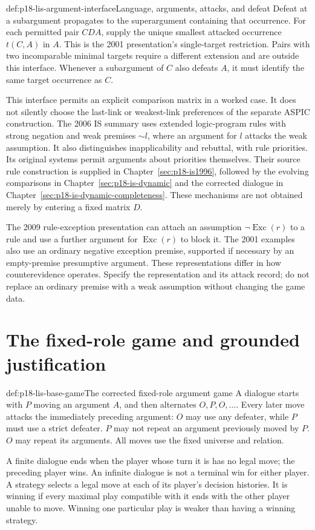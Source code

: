 \begin{hbdefinition}{def:p18-lis-argument-interface}{Language, arguments, attacks, and defeat}
Defeat at a subargument propagates to the superargument containing
that occurrence. For each permitted pair \(CDA\), supply the unique
smallest attacked occurrence \(t(C,A)\) in \(A\).
This is the 2001 presentation's single-target restriction.
Pairs with two incomparable minimal targets require a different
extension and are outside this interface.
Whenever a subargument of \(C\) also defeats \(A\), it must identify
the same target occurrence as \(C\).
\end{hbdefinition}

This interface permits an explicit comparison matrix in a worked case.
It does not silently choose the last-link or weakest-link preferences
of the separate ASPIC construction.
The 2006 IS summary uses extended logic-program rules with strong
negation and weak premises \(\mathord{\sim}l\), where an argument
for \(l\) attacks the weak assumption.
It also distinguishes inapplicability and rebuttal, with rule priorities.
Its original systems permit arguments about priorities themselves.
Their source rule construction is supplied in
Chapter~\ref{sec:p18-is1996}, followed by the evolving comparisons
in Chapter~\ref{sec:p18-is-dynamic} and the corrected dialogue
in Chapter~\ref{sec:p18-is-dynamic-completeness}.
These mechanisms are not obtained merely by entering a fixed
matrix \(D\).

The 2009 rule-exception presentation can attach an assumption
\(\neg\operatorname{Exc}(r)\) to a rule and use a further argument
for \(\operatorname{Exc}(r)\) to block it.
The 2001 examples also use an ordinary negative exception premise,
supported if necessary by an empty-premise presumptive argument.
These representations differ in how counterevidence operates.
Specify the representation and its attack record; do not replace an
ordinary premise with a weak assumption without changing the game data.

\section{The fixed-role game and grounded justification}
\label{sec:p18-lis-base-game}

\begin{hbdefinition}{def:p18-lis-base-game}{The corrected fixed-role argument game}
A dialogue starts with \(P\) moving an argument \(A\), and then
alternates \(O,P,O,\ldots\).
Every later move attacks the immediately preceding argument:
\(O\) may use any defeater, while \(P\) must use a strict defeater.
\(P\) may not repeat an argument previously moved by \(P\).
\(O\) may repeat its arguments.
All moves use the fixed universe and relation.

A finite dialogue ends when the player whose turn it is has no
legal move; the preceding player wins.
An infinite dialogue is not a terminal win for either player.
A strategy selects a legal move at each of its player's decision
histories. It is winning if every maximal play compatible with it
ends with the other player unable to move.
Winning one particular play is weaker than having a winning strategy.
\end{hbdefinition}

